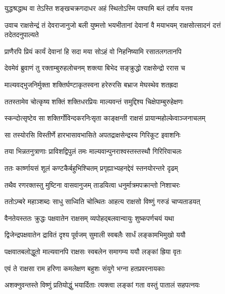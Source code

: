 \twolineshloka
{युद्धश्रद्धाथ वा तेऽस्ति शङ्खचक्रगदाधर}
{अहं स्थितोऽस्मि पश्यामि बलं दर्शय यत्तव} %

\threelineshloka
{उवाच राक्षसेन्द्रं तं देवराजानुजो बली}
{युष्मत्तो भयभीतानां देवानां वै मयाभयम्}
{राक्षसोत्सादनं दत्तं तदेतदनुपाल्यते} %

\twolineshloka
{प्राणैरपि प्रियं कार्यं देवानां हि सदा मया}
{सोऽहं वो निहनिष्यामि रसातलगतानपि} %

\twolineshloka
{देवमेवं ब्रुवाणं तु रक्ताम्बुरुहलोचनम्}
{शक्त्या बिभेद सङ्क्रुद्धो राक्षसेन्द्रो ररास च} %

\twolineshloka
{माल्यवद्भुजनिर्मुक्ता शक्तिर्घण्टाकृतस्वना}
{हरेरुरसि बभ्राज मेघस्थेव शतह्रदा} %

\twolineshloka
{ततस्तामेव चोत्कृष्य शक्तिं शक्तिधरप्रियः}
{माल्यवन्तं समुद्दिश्य चिक्षेपाम्बुरुहेक्षणः} %

\twolineshloka
{स्कन्दोत्सृष्टेव सा शक्तिर्गोविन्दकरनिःसृता}
{काङ्क्षन्ती राक्षसं प्रायान्महोल्केवाञ्जनाचलम्} %

\twolineshloka
{सा तस्योरसि विस्तीर्णे हारभासावभासिते}
{अपतद्राक्षसेन्द्रस्य गिरिकूट इवाशनिः} %

\twolineshloka
{तया भिन्नतनुत्राणाः प्राविशद्विपुलं तमः}
{माल्यवान्पुनराश्वस्तस्तस्थौ गिरिरिवाचलः} %

\twolineshloka
{ततः कार्ष्णायसं शूलं कण्टकैर्बहुभिश्चितम्}
{प्रगृह्याभ्यहनद्देवं स्तनयोरन्तरे दृढम्} %

\twolineshloka
{तथैव रणरक्तस्तु मुष्टिना वासवानुजम्}
{ताडयित्वा धनुर्मात्रमपक्रान्तो निशाचरः} %

\twolineshloka
{ततोऽम्बरे महाञ्शब्दः साधु साध्विति चोत्थितः}
{आहत्य राक्षसो विष्णुं गरुडं चाप्यताडयत्} %

\twolineshloka
{वैनतेयस्ततः क्रुद्धः पक्षवातेन राक्षसम्}
{व्यपोहद्बलवान्वायुः शुष्कपर्णचयं यथा} %

\twolineshloka
{द्विजेन्द्रपक्षवातेन द्रावितं दृश्य पूर्वजम्}
{सुमाली स्वबलैः सार्धं लङ्कामभिमुखो ययौ} %

\twolineshloka
{पक्षवातबलोद्धूतो माल्यवानपि राक्षसः}
{स्वबलेन समागम्य ययौ लङ्कां ह्रिया वृतः} %

\twolineshloka
{एवं ते राक्षसा राम हरिणा कमलेक्षण}
{बहुशः संयुगे भग्ना हतप्रवरनायकाः} %

\twolineshloka
{अशक्नुवन्तस्ते विष्णुं प्रतियोद्धुं भयार्दिताः}
{त्यक्त्वा लङ्कां गता वस्तुं पातालं सहपत्नयः} %

